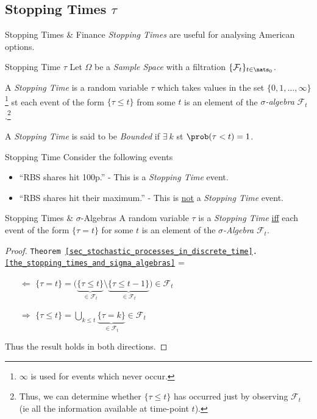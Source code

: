 \documentclass[11pt,a4paper]{article}
\begin{document}
\subsection{Stopping Times $\tau$}

    \begin{remark}{Stopping Times \& Finance}
      \textit{Stopping Times} are useful for analysing American options.
    \end{remark}

    \begin{definition}{Stopping Time $\tau$}
      Let $\Omega$ be a \textit{Sample Space} with a filtration $\{\mathcal{F}_t\}_{t\in\nats_0}$.
      \par A \textit{Stopping Time} is a random variable $\tau$ which takes values in the set $\{0,1,\dots,\infty\}$\footnote{$\infty$ is used for events which never occur.} st each event of the form $\{\tau\leq t\}$ from some $t$ is an element of the \textit{$\sigma$-algebra} $\mathcal{F}_t$.\footnote{Thus, we can determine whether $\{\tau\leq t\}$ has occurred just by observing $\mathcal{F}_t$ (ie all the information available at time-point $t$).}
      \par A \textit{Stopping Time} is said to be \textit{Bounded} if $\exists\ k$ st $\prob(\tau<t)=1$.
    \end{definition}

    \begin{example}{Stopping Time}
      Consider the following events
      \begin{itemize}
        \item ``RBS shares hit 100p.'' - This is a \textit{Stopping Time} event.
        \item ``RBS shares hit their maximum.'' - This is \underline{not} a \textit{Stopping Time} event.
      \end{itemize}
    \end{example}

    \begin{theorem}{Stopping Times \& $\sigma$-Algebras}\label{the_stopping_times_and_sigma_algebras}
      A random variable $\tau$ is a \textit{Stopping Time} \underline{iff} each event of the form $\{\tau=t\}$ for some $t$ is an element of the \textit{$\sigma$-Algebra} $\mathcal{F}_t$.
    \end{theorem}

    \begin{proof}{\texttt{Theorem \ref{sec_stochastic_processes_in_discrete_time}.\ref{the_stopping_times_and_sigma_algebras}} }
      \everymath={\displaystyle}
      \begin{itemize}
        \item[$\Longleftarrow$] $ \{\tau=t\}=\big(\underbrace{\{\tau\leq t\}}_{\in\mathcal{F}_t}\setminus\underbrace{\{\tau\leq t-1\}}_{\in\mathcal{F}_t}\big)\in\mathcal{F}_t$
        \item[$\Longrightarrow$] $\{\tau\leq t\}=\bigcup\limits_{k\leq t}\underbrace{\{\tau=k\}}_{\in\mathcal{F}_t}\in\mathcal{F}_t$
      \end{itemize}
      Thus the result holds in both directions.
    \end{proof}
\end{document}
